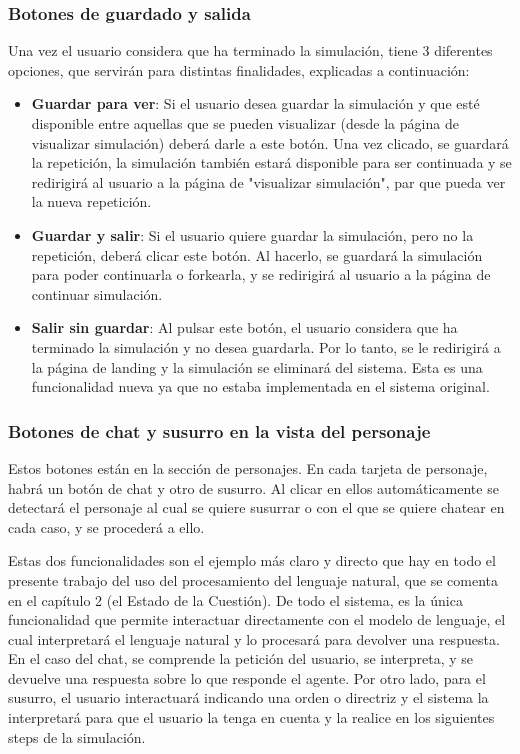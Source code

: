 \subsubsection{Botones de guardado y salida}

Una vez el usuario considera que ha terminado la simulación, tiene 3 diferentes opciones, que servirán para distintas finalidades, explicadas a continuación:

\begin{itemize}
	
	\item \textbf{Guardar para ver}: Si el usuario desea guardar la simulación y que esté disponible entre aquellas que se pueden visualizar (desde la página de visualizar simulación) deberá darle a este botón. Una vez clicado, se guardará la repetición, la simulación también estará disponible para ser continuada y se redirigirá al usuario a la página de "visualizar simulación", par que pueda ver la nueva repetición.
	
	\item \textbf{Guardar y salir}: Si el usuario quiere guardar la simulación, pero no la repetición, deberá clicar este botón. Al hacerlo, se guardará la simulación para poder continuarla o forkearla, y se redirigirá al usuario a la página de continuar simulación.
	
	\item \textbf{Salir sin guardar}: Al pulsar este botón, el usuario considera que ha terminado la simulación y no desea guardarla. Por lo tanto, se le redirigirá a la página de landing y la simulación se eliminará del sistema. Esta es una funcionalidad nueva ya que no estaba implementada en el sistema original.

\end{itemize}

\subsubsection{Botones de chat y susurro en la vista del personaje}

Estos botones están en la sección de personajes. En cada tarjeta de personaje, habrá un botón de chat y otro de susurro. Al clicar en ellos automáticamente se detectará el personaje al cual se quiere susurrar o con el que se quiere chatear en cada caso, y se procederá a ello.

Estas dos funcionalidades son el ejemplo más claro y directo que hay en todo el presente trabajo del uso del procesamiento del lenguaje natural, que se comenta en el capítulo 2 (el Estado de la Cuestión). De todo el sistema, es la única funcionalidad que permite interactuar directamente con el modelo de lenguaje, el cual interpretará el lenguaje natural y lo procesará para devolver una respuesta. En el caso del chat, se comprende la petición del usuario, se interpreta, y se devuelve una respuesta sobre lo que responde el agente. Por otro lado, para el susurro, el usuario interactuará indicando una orden o directriz y el sistema la interpretará para que el usuario la tenga en cuenta y la realice en los siguientes steps de la simulación.


